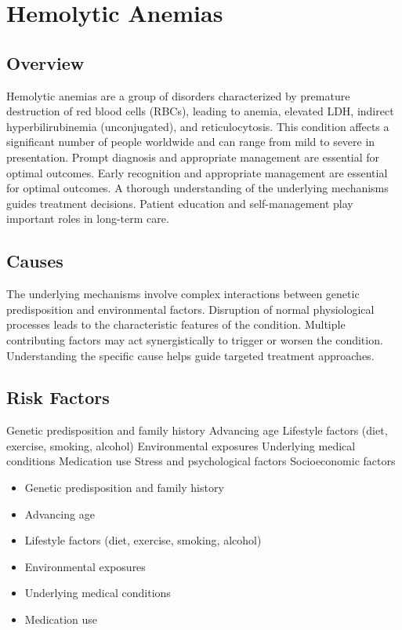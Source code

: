 \chapter{Hemolytic Anemias}
\label{sec:Hemolytic Anemias}

\section{Overview}
Hemolytic anemias are a group of disorders characterized by premature destruction of red blood cells (RBCs), leading to anemia, elevated LDH, indirect hyperbilirubinemia (unconjugated), and reticulocytosis. This condition affects a significant number of people worldwide and can range from mild to severe in presentation. Prompt diagnosis and appropriate management are essential for optimal outcomes. Early recognition and appropriate management are essential for optimal outcomes. A thorough understanding of the underlying mechanisms guides treatment decisions. Patient education and self-management play important roles in long-term care.
\section{Causes}
The underlying mechanisms involve complex interactions between genetic predisposition and environmental factors. Disruption of normal physiological processes leads to the characteristic features of the condition. Multiple contributing factors may act synergistically to trigger or worsen the condition. Understanding the specific cause helps guide targeted treatment approaches.
\section{Risk Factors}
Genetic predisposition and family history Advancing age Lifestyle factors (diet, exercise, smoking, alcohol) Environmental exposures Underlying medical conditions Medication use Stress and psychological factors Socioeconomic factors

\begin{itemize}[noitemsep]
  \item Genetic predisposition and family history
  \item Advancing age
  \item Lifestyle factors (diet, exercise, smoking, alcohol)
  \item Environmental exposures
  \item Underlying medical conditions
  \item Medication use
\end{itemize}
